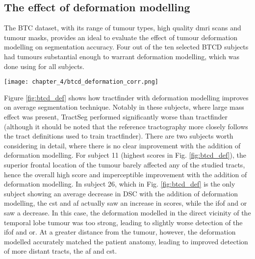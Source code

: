 \subsection{The effect of deformation modelling}

The BTC dataset, with its range of tumour types, high quality \gls{dmri} scans and tumour masks, provides an ideal  to evaluate the effect of tumour deformation modelling on segmentation accuracy.
Four out of the ten selected BTCD subjects had tumours substantial enough to warrant deformation modelling, which was done using  for all subjects.

\begin{SCfigure}[][htb!]
  \texttt{[image: chapter\_4/btcd\_deformation\_corr.png]}
  \caption{Effect of deformation modelling on segmentation accuracy, compared to tractfinder without deformation modelling. Each heavy datapoint represents the average across tracts for a single subject, the light datapoints represent individual tracts. There are only three heavy contralateral datapoints because one of the four subjects had a midline tumour (all tracts considered ipsilateral).}
  \label{fig:btcd_def}
\end{SCfigure}

Figure \ref{fig:btcd_def} shows how tractfinder with deformation modelling improves on average segmentation technique.
Notably in these subjects, where large mass effect was present, TractSeg performed significantly worse than tractfinder (although it should be noted that the reference tractography more closely follows the tract definitions used to train tractfinder).
There are two subjects worth considering in detail, where there is no clear improvement with the addition of deformation modelling.
For subject 11 (highest scores in Fig. \ref{fig:btcd_def}), the superior frontal location of the tumour barely affected any of the studied tracts, hence the overall high score and imperceptible improvement with the addition of deformation modelling.
In subject 26, which in Fig. \ref{fig:btcd_def} is the only subject showing an average decrease in DSC with the addition of deformation modelling, the \gls{cst} and \gls{af} actually saw an increase in scores, while the \gls{ifof} and \gls{or} saw a decrease.
In this case, the deformation modelled in the direct vicinity of the temporal lobe tumour was too strong, leading to slightly worse detection of the \gls{ifof} and \gls{or}.
At a greater distance from the tumour, however, the deformation modelled accurately matched the patient anatomy, leading to improved detection of more distant tracts, the \gls{af} and \gls{cst}.
